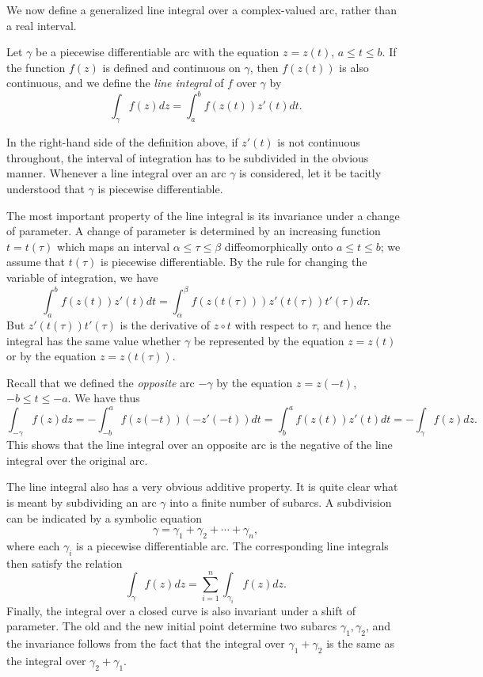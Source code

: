 We now define a generalized line integral over a complex-valued arc, rather than a real interval.

\begin{definition}
    Let $\gamma$ be a piecewise differentiable arc with the equation $z=z(t)$, $a \le t \le b$. If the function $f(z)$ is defined and continuous on $\gamma$, then $f(z(t))$ is also continuous, and we define the \emph{line integral} of $f$ over $\gamma$ by $$\int_{\gamma}f(z)dz=\int_{a}^{b}f(z(t))z'(t)dt.$$
\end{definition}

In the right-hand side of the definition above, if $z'(t)$ is not continuous throughout, the interval of integration has to be subdivided in the obvious manner. Whenever a line integral over an arc $\gamma$ is considered, let it be tacitly understood that $\gamma$ is piecewise differentiable.

The most important property of the line integral is its invariance under a change of parameter. A change of parameter is determined by an increasing function $t=t(\tau)$ which maps an interval $\alpha \le \tau \le \beta$ diffeomorphically onto $a \le t \le b$; we assume that $t(\tau)$ is piecewise differentiable. By the rule for changing the variable of integration, we have $$\int_{a}^{b} f(z(t))z'(t)dt=\int_{\alpha}^{\beta} f(z(t(\tau)))z'(t(\tau))t'(\tau)d\tau.$$ But $z'(t(\tau))t'(\tau)$ is the derivative of $z \circ t$ with respect to $\tau$, and hence the integral has the same value whether $\gamma$ be represented by the equation $z=z(t)$ or by the equation $z=z(t(\tau))$.

Recall that we defined the \emph{opposite} arc $-\gamma$ by the equation $z=z(-t)$, $-b \le t \le -a$. We have thus $$\int_{-\gamma} f(z)dz = -\int_{-b}^{a}f(z(-t))(-z'(-t))dt=\int_{b}^{a}f(z(t))z'(t)dt=-\int_{\gamma}f(z)dz.$$ This shows that the line integral over an opposite arc is the negative of the line integral over the original arc.

The line integral also has a very obvious additive property. It is quite clear what is meant by subdividing an arc $\gamma$ into a finite number of subarcs. A subdivision can be indicated by a symbolic equation $$\gamma=\gamma_1+\gamma_2+\cdots+\gamma_n,$$ where each $\gamma_i$ is a piecewise differentiable arc. The corresponding line integrals then satisfy the relation $$\int_{\gamma}f(z)dz=\sum_{i=1}^{n}\int_{\gamma_i}f(z)dz.$$ Finally, the integral over a closed curve is also invariant under a shift of parameter. The old and the new initial point determine two subarcs $\gamma_1,\gamma_2$, and the invariance follows from the fact that the integral over $\gamma_1+\gamma_2$ is the same as the integral over $\gamma_2+\gamma_1$.

